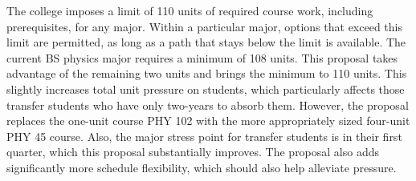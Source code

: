 \documentclass[12pt]{article}
\begin{document}
The college imposes a limit of 110 units of required course work,
including prerequisites, for any major.  Within a particular major,
options that exceed this limit are permitted, as long as a path that
stays below the limit is available.  The current BS physics major
requires a minimum of 108 units.  This proposal takes advantage of the
remaining two units and brings the minimum to 110 units.  This
slightly increases total unit pressure on students, which particularly
affects those transfer students who have only two-years to absorb
them.  However, the proposal replaces the one-unit course PHY 102 with
the more appropriately sized four-unit PHY 45 course.  Also, the major
stress point for transfer students is in their first quarter, which
this proposal substantially improves.  The proposal also adds
significantly more schedule flexibility, which should also help
alleviate pressure.
\end{document}
